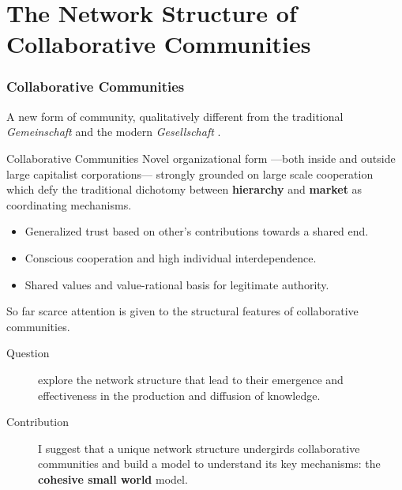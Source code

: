 \documentclass[ignorenonframetext,red,8pt,notes=hide]{beamer}
\begin{document}
\section{The Network Structure of Collaborative Communities}

\begin{frame}
\frametitle{Collaborative Communities}
A new form of community, qualitatively different from the traditional \emph{Gemeinschaft} and the modern \emph{Gesellschaft} \citep{tonnies:1974}. 

\begin{block}{Collaborative Communities \citep{adler:2006}}
Novel organizational form ---both inside and outside large capitalist corporations--- strongly grounded on large scale cooperation which defy the traditional dichotomy between \textbf{hierarchy} and \textbf{market} as coordinating mechanisms.

\begin{itemize}
\item Generalized trust based on other's contributions towards a shared end.
\item Conscious cooperation and high individual interdependence.
\item Shared values and value-rational basis for legitimate authority. 
\end{itemize}
\end{block}

\pause

So far scarce attention is given to the structural features of collaborative communities.

\begin{description}
\item[Question] explore the network structure that lead to their emergence and effectiveness in the production and diffusion of knowledge.

\item[Contribution] I suggest that a unique network structure undergirds collaborative communities and build a model to understand its key mechanisms: the \textbf{cohesive small world} model.
\end{description}

\end{frame}
\end{document}
